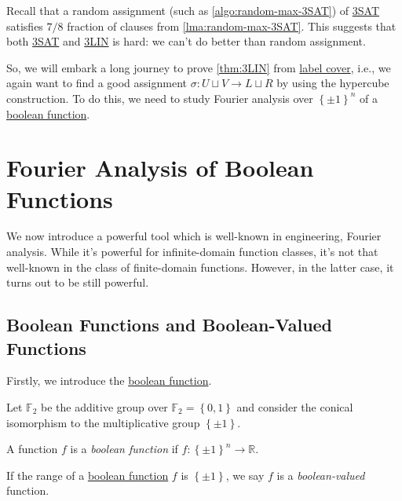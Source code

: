 \begin{note}
	Recall that a random assignment (such as \autoref{algo:random-max-3SAT}) of \hyperref[prb:max-3SAT]{3SAT} satisfies \(7 / 8\) fraction of clauses from \autoref{lma:random-max-3SAT}. This suggests that both \hyperref[prb:max-3SAT]{3SAT} and \hyperref[prb:max-3LIN]{3LIN} is hard: we can't do better than random assignment.
\end{note}

So, we will embark a long journey to prove \autoref{thm:3LIN} from \hyperref[prb:label-cover]{label cover}, i.e., we again want to find a good assignment \(\sigma \colon U \sqcup V \to L \sqcup R\) by using the hypercube construction. To do this, we need to study Fourier analysis over \(\left\{ \pm 1 \right\} ^n\) of a \hyperref[def:boolean-function]{boolean function}.

\section{Fourier Analysis of Boolean Functions}
We now introduce a powerful tool which is well-known in engineering, Fourier analysis. While it's powerful for infinite-domain function classes, it's not that well-known in the class of finite-domain functions. However, in the latter case, it turns out to be still powerful.

\subsection{Boolean Functions and Boolean-Valued Functions}
Firstly, we introduce the \hyperref[def:boolean-function]{boolean function}.

\begin{definition*}
	Let \(\mathbb{F} _2\) be the additive group over \(\mathbb{F} _2 = \left\{ 0, 1 \right\} \) and consider the conical isomorphism to the multiplicative group \(\left\{ \pm 1 \right\} \).
	\begin{definition}\label{def:boolean-function}
		A function \(f\) is a \emph{boolean function} if \(f\colon \left\{ \pm 1 \right\} ^n \to \mathbb{R} \).
	\end{definition}

	\begin{definition}\label{def:boolean-valued}
		If the range of a \hyperref[def:boolean-function]{boolean function} \(f\) is \(\left\{ \pm 1 \right\} \), we say \(f\) is a \emph{boolean-valued} function.
	\end{definition}
\end{definition*}

